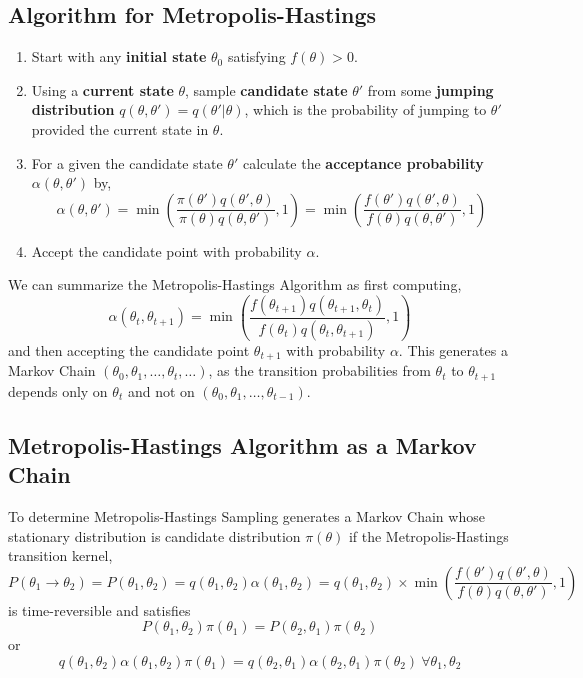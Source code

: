 \subsection{Algorithm for Metropolis-Hastings}
\begin{enumerate}
	\item Start with any \textbf{initial state}  $ \theta_0 $ satisfying $ f(\theta) > 0 $.
	\item Using a \textbf{current state}  $ \theta $, sample \textbf{candidate state} $ \theta' $ from some \textbf{jumping distribution} $ q(\theta, \theta') = q(\theta'|\theta) $, which is the probability of jumping to $ \theta' $ provided the current state in $ \theta $.
	\item For a given the candidate state $ \theta' $ calculate the \textbf{acceptance probability} $ \alpha(\theta,\theta') $ by,
	      \[
		      \alpha(\theta,\theta') =\min\left( \frac{\pi(\theta')q(\theta', \theta)}{\pi(\theta)q(\theta, \theta')}, 1\right) = \min\left( \frac{f(\theta')q(\theta', \theta)}{f(\theta)q(\theta, \theta')} , 1\right)
	      \]
	\item  Accept the candidate point with probability $ \alpha $.

\end{enumerate}
We can summarize the Metropolis-Hastings Algorithm as first computing,
\[
	\alpha(\theta_{t},\theta_{t+1}) = \min \left( \frac{f(\theta_{t+1})q(\theta_{t+1},\theta_t)}{ f(\theta_t) q(\theta_t,\theta_{t+1}) }, 1 \right)
\]
and then accepting the candidate point $ \theta_{t+1} $ with probability $ \alpha $. This generates a Markov Chain $ ( \theta_0,\theta_1,\ldots,\theta_t,\ldots ) $,
as the transition probabilities from $ \theta_t $ to $ \theta_{t+1} $ depends only on $ \theta_t $ and not on $ (\theta_0,\theta_1,\ldots,\theta_{t-1}) $.

\subsection{Metropolis-Hastings Algorithm as a Markov Chain}
To determine Metropolis-Hastings Sampling generates a Markov Chain whose stationary distribution is candidate distribution $ \pi(\theta) $ if the Metropolis-Hastings transition kernel,
\begin{equation}
	\label{transition-kernel}
	P(\theta_1\to \theta_2) = P(\theta_1,\theta_2) = q(\theta_1,\theta_2)\alpha(\theta_1,\theta_2) = q(\theta_1,\theta_2)\times \min\left( \frac{f(\theta')q(\theta', \theta)}{f(\theta)q(\theta, \theta')} , 1\right)
\end{equation}
is time-reversible and satisfies
\[
	P(\theta_1, \theta_2) \pi(\theta_1) = P(\theta_2, \theta_1) \pi(\theta_2)
\]
or
\begin{equation}
	\label{balance-equatation}
	q(\theta_1,\theta_2)\alpha(\theta_1,\theta_2)\pi(\theta_1) = q(\theta_2,\theta_1)\alpha(\theta_2,\theta_1)\pi(\theta_2) \ \forall \theta_1, \theta_2
\end{equation}

